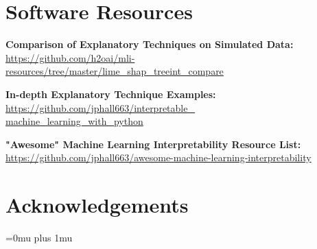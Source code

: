 \documentclass{article}
\begin{document}
\section{Software Resources} \label{sec:software}

\sloppy

\textbf{Comparison of Explanatory Techniques on Simulated Data:}\\
\href{https://github.com/h2oai/mli-resources/tree/master/lime_shap_treeint_compare}{https://github.com/h2oai/mli-resources/tree/master/lime\_shap\_treeint\_compare}\\

\vspace{10pt}

\textbf{In-depth Explanatory Technique Examples:}\\
\href{https://github.com/jphall663/interpretable_machine_learning_with_python}{https://github.com/jphall663/interpretable\_\\machine\_learning\_with\_python}\\

\vspace{10pt}

\textbf{"Awesome" Machine Learning Interpretability Resource List:}\\
\href{https://github.com/jphall663/awesome-machine-learning-interpretability}{https://github.com/jphall663/awesome-machine-learning-interpretability}

\fussy

\section{Acknowledgements} 



\Urlmuskip=0mu plus 1mu\relax


\end{document}

